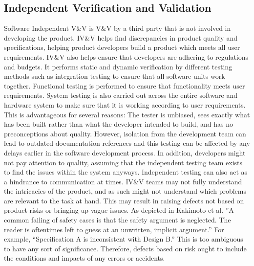 \documentclass[journal, onecolumn]{IEEEtran}
\begin{document}
	\subsection{Independent Verification and Validation}
	\bigskip
	Software Independent V\&V is V\&V by a third party that is not involved in developing the product. IV\&V helps find discrepancies in product quality and specifications, helping product developers build a product which meets all user requirements. IV\&V also helps ensure that developers are adhering to regulations and budgets. It performs static and dynamic verification by different testing methods such as integration testing to ensure that all software units work together. Functional testing is performed to ensure that functionality meets user requirements. System testing is also carried out across the entire software and hardware system to make sure that it is working according to user requirements.
	\newline \newline
	This is advantageous for several reasons: The tester is unbiased, sees exactly what has been built rather than what the developer intended to build, and has no preconceptions about quality. However, isolation from the development team can lead to outdated documentation references and this testing can be affected by any delays earlier in the software development process. In addition, developers might not pay attention to quality, assuming that the independent testing team exists to find the issues within the system anyways. Independent testing can also act as a hindrance to communication at times.
	\newline \newline
	IV\&V teams may not fully understand the intricacies of the product, and as such might not understand which problems are relevant to the task at hand. This may result in raising defects not based on product risks or bringing up vague issues.
	\newline \newline
	As depicted in Kakimoto et al. \cite{ivv} ”A common failing of safety cases is that the safety argument is neglected. The reader is oftentimes left to guess at an unwritten, implicit argument.” 
	\newline \newline
	For example, 
	“Specification A is inconsistent with Design B.”
	\newline \newline
	This is too ambiguous to have any sort of significance. Therefore, defects based on risk ought to include the conditions and impacts of any errors or accidents.
\end{document}

